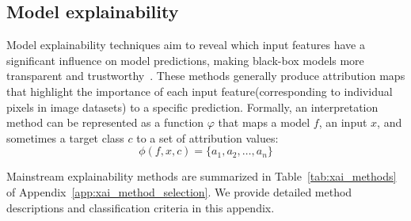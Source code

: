 \documentclass{article}
\begin{document}
\subsection{Model explainability}
Model explainability techniques aim to reveal which input features have a significant influence on model predictions, making black-box models more transparent and trustworthy~\cite{hassija2024interpreting,zhang2021survey,fan2021interpretability,dong2017improving,salahuddin2022transparency,li2022interpretable,linardatos2020explainable,ghorbani2019interpretation}. These methods generally produce attribution maps that highlight the importance of each input feature(corresponding to individual pixels in image datasets) to a specific prediction. Formally, an interpretation method can be represented as a function $\varphi$ that maps a model $f$, an input $x$, and sometimes a target class $c$ to a set of attribution values:
$$
\phi(f, x, c) = \{a_1, a_2, \ldots, a_n\}
$$

Mainstream explainability methods are summarized in Table~\ref{tab:xai_methods} of Appendix~\ref{app:xai_method_selection}. We provide detailed method descriptions and classification criteria in this appendix.



\end{document}
